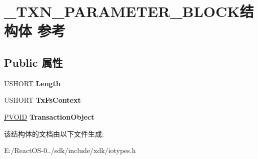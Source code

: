 \hypertarget{struct___t_x_n___p_a_r_a_m_e_t_e_r___b_l_o_c_k}{}\section{\+\_\+\+T\+X\+N\+\_\+\+P\+A\+R\+A\+M\+E\+T\+E\+R\+\_\+\+B\+L\+O\+C\+K结构体 参考}
\label{struct___t_x_n___p_a_r_a_m_e_t_e_r___b_l_o_c_k}
\subsection*{Public 属性}
\begin{DoxyCompactItemize}
\item 
\mbox{\label{struct___t_x_n___p_a_r_a_m_e_t_e_r___b_l_o_c_k_a374c41bb4ea3bbfbff3348fe220d3e88}} 
U\+S\+H\+O\+RT {\bfseries Length}
\item 
\mbox{\label{struct___t_x_n___p_a_r_a_m_e_t_e_r___b_l_o_c_k_aceb19b00be942b6671d6f843d289713a}} 
U\+S\+H\+O\+RT {\bfseries Tx\+Fs\+Context}
\item 
\mbox{\label{struct___t_x_n___p_a_r_a_m_e_t_e_r___b_l_o_c_k_a5ad32ab0ead94949a0ed95b96022afc1}} 
\hyperlink{interfacevoid}{P\+V\+O\+ID} {\bfseries Transaction\+Object}
\end{DoxyCompactItemize}


该结构体的文档由以下文件生成\+:\begin{DoxyCompactItemize}
\item 
E\+:/\+React\+O\+S-\/0../sdk/include/xdk/iotypes.\+h\end{DoxyCompactItemize}
